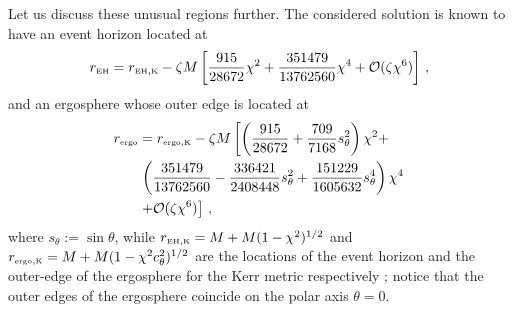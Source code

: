 \documentclass[prd,twocolumn,showpacs,superscriptaddress,nofootinbib]{revtex4-2}
\newcommand\be{\begin{equation}}
\newcommand\ee{\end{equation}}
\newcommand{\EH}{{\mbox{\tiny EH}}}
\newcommand{\K}{{\mbox{\tiny K}}}
\newcommand{\ergo}{{\mbox{\tiny ergo}}}
\begin{document}
Let us discuss these unusual regions further. The considered solution is known to have an event horizon located at
%
\be
r_{\EH} = r_{\EH,\K}  - \zeta M \left[\frac{915}{28672} \chi^2 + \frac{351479}{13762560} \chi^4 + {\cal{O}}(\zeta \chi^6)\right]\,,
\ee
%
and an ergosphere whose outer edge is located at
%
\begin{align}
r_{\ergo} &= r_{\ergo,\K}  - \zeta M \left[
\left( 
\frac{915}{28672} + \frac{709}{7168} s_{\theta}^2 
\right) \chi^2 +
\right.
\nonumber \\
&\left.
\left( 
 \frac{351479}{13762560} 
- \frac{336421}{2408448} s_{\theta}^2
+ \frac{151229}{1605632} s_{\theta}^4
\right) \chi^4 
\right.
\nonumber \\
&\left.
+ {\cal{O}}(\zeta \chi^6)\right]\,,
\end{align}
%
where $s_{\theta} := \sin{\theta}$, while $r_{\EH,\K} = M + M (1 - \chi^2)^{1/2}$ and $r_{\ergo,\K} = M + M (1 - \chi^2 c_{\theta}^2)^{1/2}$ are the locations of the event horizon and the outer-edge of the ergosphere for the Kerr metric respectively \cite{Yunes:2009hc,Yagi:2012ya,Maselli:2017kic}; notice that the outer edges of the ergosphere coincide on the polar axis $\theta = 0$. 
\end{document}
